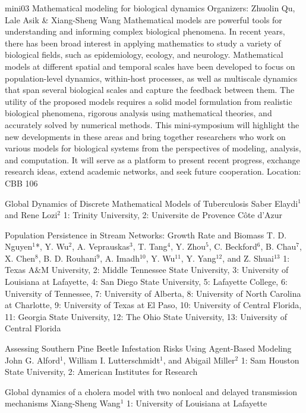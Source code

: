 \mini
{mini03}
{Mathematical modeling for biological dynamics}
{Organizers: Zhuolin Qu, Lale Asik \& Xiang-Sheng Wang}
{Mathematical models are powerful tools for understanding and informing complex biological phenomena. In recent years, there has been broad interest in applying mathematics to study a variety of biological fields, such as epidemiology, ecology, and neurology. Mathematical models at different spatial and temporal scales have been developed to focus on population-level dynamics, within-host processes, as well as multiscale dynamics that span several biological scales and capture the feedback between them. The utility of the proposed models requires a solid model formulation from realistic biological phenomena, rigorous analysis using mathematical theories, and accurately solved by numerical methods. This mini-symposium will highlight the new developments in these areas and bring together researchers who work on various models for biological systems from the perspectives of modeling, analysis, and computation. It will serve as a platform to present recent progress, exchange research ideas, extend academic networks, and seek future cooperation.}
{Location: CBB 106}

\begin{talks}
\item\talk
{Global Dynamics of Discrete Mathematical Models of Tuberculosis}
{Saber Elaydi$^{1}$ and Rene Lozi$^{2}$}
{1: Trinity University, 2:  Universite de Provence Côte d'Azur}
\item\talk
{Population Persistence in Stream Networks: Growth Rate and Biomass}
{ T. D. Nguyen$^{1}$*, Y. Wu$^{2}$, A. Veprauskas$^{3}$, T. Tang$^{4}$, Y. Zhou$^{5}$, C. Beckford$^{6}$, B. Chau$^{7}$, X. Chen$^{8}$, B. D. Rouhani$^{9}$, A. Imadh$^{10}$, Y. Wu$^{11}$, Y. Yang$^{12}$, and Z. Shuai$^{13}$ }
{1: Texas A$\&$M University, 2: Middle Tennessee State University, 3: University of Louisiana at Lafayette, 4: San Diego State University, 5: Lafayette College, 6: University of Tennessee, 7: University of Alberta, 8: University of North Carolina at Charlotte, 9: University of Texas at El Paso, 10: University of Central Florida, 11: Georgia State University, 12: The Ohio State University, 13: University of Central Florida}
\item\talk
{Assessing Southern Pine Beetle Infestation Risks Using Agent-Based Modeling}
{John G. Alford$^{1}$, William I. Lutterschmidt$^{1}$, and Abigail Miller$^{2}$}
{1: Sam Houston State University, 2: American Institutes for Research}
\item\talk
{Global dynamics of a cholera model with two nonlocal and delayed transmission mechanisms}
{Xiang-Sheng Wang$^{1}$}
{1: University of Louisiana at Lafayette}
\end{talks}
\room
